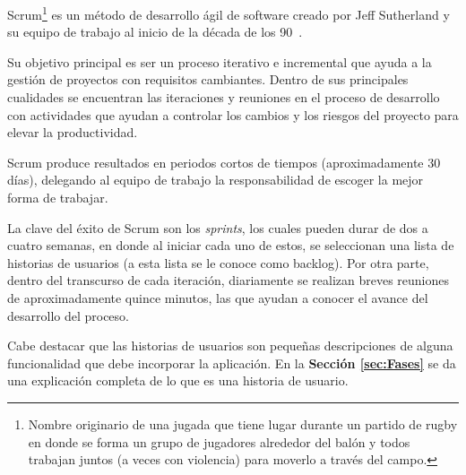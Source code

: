 Scrum\footnote{Nombre originario  de una jugada que tiene lugar durante un partido de rugby en donde se forma un grupo de jugadores alrededor del balón y todos trabajan juntos (a veces con violencia) para moverlo a través del campo. } es un método de desarrollo ágil de software creado por Jeff Sutherland y su equipo de trabajo al inicio de la década de los 90~\cite{7}.

Su objetivo principal es ser un proceso iterativo e incremental que ayuda a la gestión de proyectos con requisitos cambiantes. Dentro de sus principales cualidades se encuentran las iteraciones y reuniones en el proceso de desarrollo con actividades que ayudan a controlar los cambios y los riesgos del proyecto para elevar la productividad.

Scrum produce resultados en periodos cortos de tiempos (aproximadamente 30 días), delegando al equipo de trabajo la responsabilidad de escoger la mejor forma de trabajar.

La clave del éxito de Scrum son los \emph{sprints}, los cuales pueden durar de dos a cuatro semanas, en donde al iniciar cada uno de estos, se seleccionan una lista de historias de usuarios (a esta lista se le conoce como backlog). Por otra parte, dentro del transcurso de cada iteración, diariamente se realizan breves reuniones de aproximadamente quince minutos, las que ayudan a conocer el avance del desarrollo del proceso.

Cabe destacar que las historias de usuarios son pequeñas descripciones de alguna funcionalidad que debe incorporar la aplicación. En la \textbf{Sección \ref{sec:Fases}} se da una explicación completa de lo que es una historia de usuario.
 

